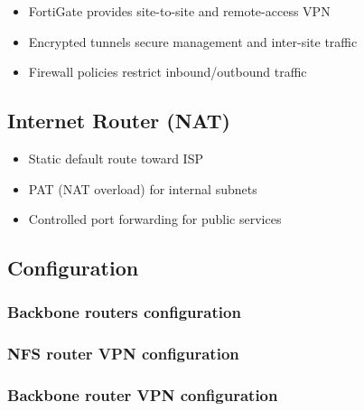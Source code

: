 \documentclass[12pt,a4paper]{article}
\begin{document}
\begin{itemize}
  \item FortiGate provides site-to-site and remote-access VPN
  \item Encrypted tunnels secure management and inter-site traffic
  \item Firewall policies restrict inbound/outbound traffic
\end{itemize}

\subsection{Internet Router (NAT)}

\begin{itemize}
  \item Static default route toward ISP
  \item PAT (NAT overload) for internal subnets
  \item Controlled port forwarding for public services
\end{itemize}

\subsection{Configuration}

\subsubsection{Backbone routers configuration}



\subsubsection{NFS router VPN configuration}



\subsubsection{Backbone router VPN configuration}


\end{document}
